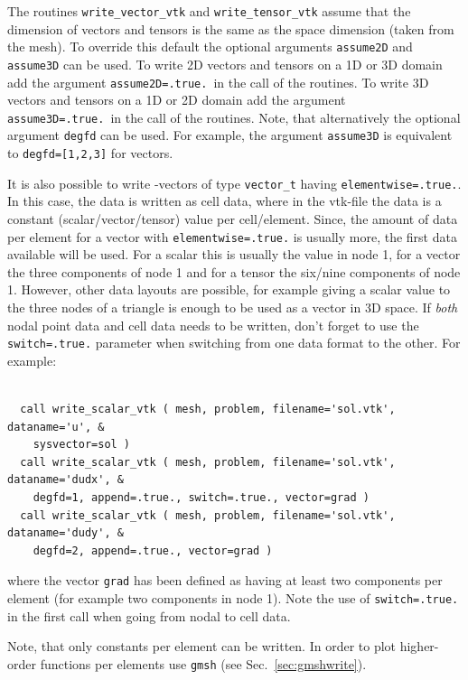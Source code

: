 The routines \texttt{write\_vector\_vtk}
and \texttt{write\_tensor\_vtk} assume that the dimension of vectors and tensors is the same as the space dimension (taken from the mesh). To override this default the optional arguments
\texttt{assume2D} and \texttt{assume3D} can be used.
To write 2D vectors and tensors on a 1D or 3D domain add the argument \texttt{assume2D=.true.}\ in the call of the routines.
To write 3D vectors and tensors on a 1D or 2D domain add the argument \texttt{assume3D=.true.}\ in the call of the routines. Note, that alternatively the optional argument \texttt{degfd} can be used. For example, the argument \texttt{assume3D} is equivalent to \texttt{degfd=[1,2,3]} for vectors.

It is also possible to write \tfem-vectors of type \texttt{vector\_t} having
\texttt{elementwise=.true.}. In this case, the data is written as
cell data, where in the vtk-file the data is a constant (scalar/vector/tensor)
value per cell/element. Since, the amount of data per element
for a vector with \texttt{elementwise=.true.} is usually more, the first data
available will be used. For a scalar this is usually the value in node 1, for a
vector the three components of node 1 and for a tensor the six/nine components
of node 1. However, other data layouts are possible, for example giving a scalar
value to the three nodes of a triangle is enough to be used as a vector in 3D
space. If \emph{both} nodal point data and cell data needs to be written,
don't forget
to use the \texttt{switch=.true.} parameter when switching from one data
format to the other. For example:
\begin{verbatim}

  call write_scalar_vtk ( mesh, problem, filename='sol.vtk', dataname='u', &
    sysvector=sol )
  call write_scalar_vtk ( mesh, problem, filename='sol.vtk', dataname='dudx', &
    degfd=1, append=.true., switch=.true., vector=grad )
  call write_scalar_vtk ( mesh, problem, filename='sol.vtk', dataname='dudy', &
    degfd=2, append=.true., vector=grad )

\end{verbatim}
where the vector \texttt{grad} has been defined as having at least
two components per element (for example two components in node 1). Note the use
of \texttt{switch=.true.} in the first call when going from nodal to cell data.

Note, that only constants per element can be written. In order to plot
higher-order functions per elements use \texttt{gmsh} (see
Sec.~\ref{sec:gmshwrite}).

